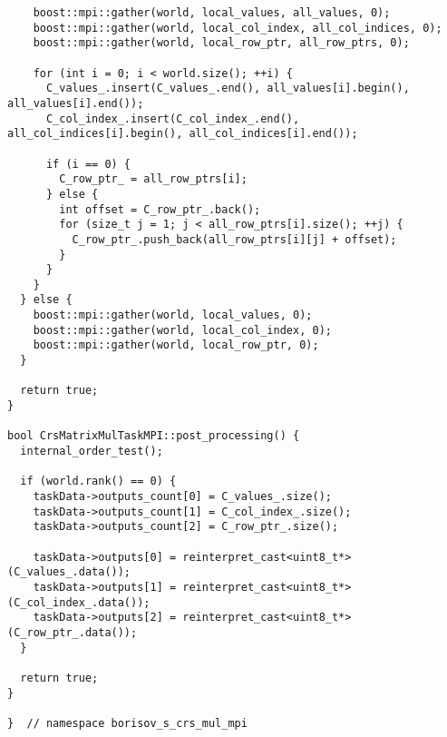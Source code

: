 \documentclass[12pt]{article}
\begin{document}
\begin{lstlisting}
    boost::mpi::gather(world, local_values, all_values, 0);
    boost::mpi::gather(world, local_col_index, all_col_indices, 0);
    boost::mpi::gather(world, local_row_ptr, all_row_ptrs, 0);

    for (int i = 0; i < world.size(); ++i) {
      C_values_.insert(C_values_.end(), all_values[i].begin(), all_values[i].end());
      C_col_index_.insert(C_col_index_.end(), all_col_indices[i].begin(), all_col_indices[i].end());

      if (i == 0) {
        C_row_ptr_ = all_row_ptrs[i];
      } else {
        int offset = C_row_ptr_.back();
        for (size_t j = 1; j < all_row_ptrs[i].size(); ++j) {
          C_row_ptr_.push_back(all_row_ptrs[i][j] + offset);
        }
      }
    }
  } else {
    boost::mpi::gather(world, local_values, 0);
    boost::mpi::gather(world, local_col_index, 0);
    boost::mpi::gather(world, local_row_ptr, 0);
  }

  return true;
}

bool CrsMatrixMulTaskMPI::post_processing() {
  internal_order_test();

  if (world.rank() == 0) {
    taskData->outputs_count[0] = C_values_.size();
    taskData->outputs_count[1] = C_col_index_.size();
    taskData->outputs_count[2] = C_row_ptr_.size();

    taskData->outputs[0] = reinterpret_cast<uint8_t*>(C_values_.data());
    taskData->outputs[1] = reinterpret_cast<uint8_t*>(C_col_index_.data());
    taskData->outputs[2] = reinterpret_cast<uint8_t*>(C_row_ptr_.data());
  }

  return true;
}

}  // namespace borisov_s_crs_mul_mpi
\end{lstlisting}
\end{document}
